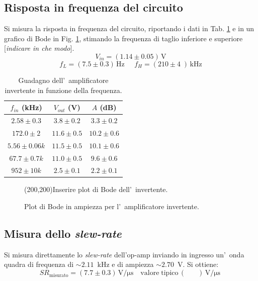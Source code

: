 \documentclass[10pt,a4paper]{article}
\newcommand{\rem}[1]{[\emph{#1}]}
\newcommand{\exn}{\phantom{xxx}}
\begin{document}
\subsection{Risposta in frequenza del circuito}
Si misura la risposta in frequenza del circuito, riportando i dati  in Tab. \ref{tab:bodeinv} e
in un grafico di Bode in Fig. \ref{fig:bodeinv}, stimando la frequenza di taglio inferiore e 
superiore \rem{indicare in che modo}.
\[
V_{in} = (1.14 \pm 0.05 )\,\mathrm{V}
\]
\[
f_L = (7.5 \pm 0.3 )\,\mathrm{Hz}\;\;\;\;\;f_H = (210 \pm 4 \;)\,\mathrm{kHz}
\]
\begin{table}[h]
\caption{\small Guadagno dell'~amplificatore invertente in funzione della frequenza.}
\label{tab:bodeinv}
\begin{center}
\begin{tabular}{|c|c|c|}
\hline
$f_{in}$ (kHz) & $V_{out}$ (V) & $A$ (dB) \\
\hline
$2.58 \pm 0.3$& $ 3.8 \pm 0.2$& $3.3\pm 0.2$ \\ 
\hline
$172.0 \pm 2$& $ 11.6 \pm 0.5$& $10.2\pm 0.6$ \\
\hline
$5.56 \pm 0.06 k$& $ 11.5 \pm 0.5$& $10.1\pm 0.6$ \\ 
\hline
$67.7 \pm 0.7 k$& $ 11.0 \pm 0.5$& $9.6\pm 0.6$ \\ 
\hline
$952 \pm 10 k$& $ 2.5 \pm 0.1$& $2.2\pm 0.1$ \\ 
\hline
\end{tabular}
\end{center}
\end{table} 




 


\begin{figure}[h]
\begin{center}
\framebox(200,200){Inserire plot di Bode dell'~invertente.}
\caption{\small Plot di Bode in ampiezza per l'~amplificatore invertente.}
\label{fig:bodeinv}
\end{center}
\end{figure}
%
\subsection{Misura dello \emph{slew-rate}}
Si misura direttamente lo \emph{slew-rate} dell'op-amp inviando in ingresso un'~onda quadra 
di frequenza di $\sim 2.11$~kHz e di ampiezza $\sim 2.70$~V. Si ottiene:
\[
SR_\mathrm{misurato} = (7.7 \pm 0.3 )\,\mathrm{V/\mu s} \quad \mathrm{valore \; tipico}\, (\exn )\,\mathrm{V/\mu s}\
\]
\end{document}
